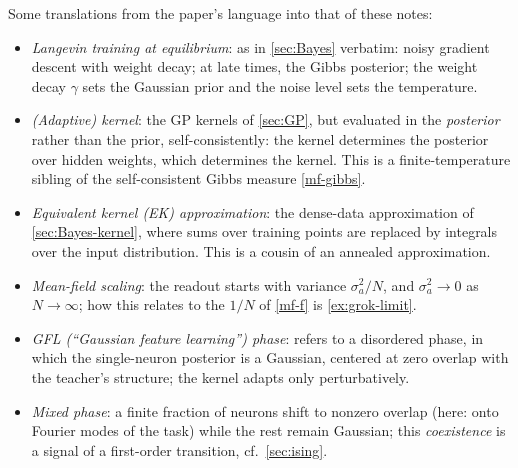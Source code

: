 \documentclass[11pt]{article}
\begin{document}
\begin{callout}[note]
Some translations from the paper's language into that of these notes:
\begin{itemize}
    \item \emph{Langevin training at equilibrium}: as in \cref{sec:Bayes} verbatim: noisy gradient descent with weight decay; at late times, the Gibbs posterior; the weight decay $\gamma$ sets the Gaussian prior and the noise level sets the temperature.
    \item \emph{(Adaptive) kernel}: the GP kernels of \cref{sec:GP}, but evaluated in the \emph{posterior} rather than the prior, self-consistently: the kernel determines the posterior over hidden weights, which determines the kernel. This is a finite-temperature sibling of the self-consistent Gibbs measure \eqref{mf-gibbs}.
    \item \emph{Equivalent kernel (EK) approximation}: the dense-data approximation of \cref{sec:Bayes-kernel}, where sums over training points are replaced by integrals over the input distribution. This is a cousin of an annealed approximation.
    \item \emph{Mean-field scaling}: the readout starts with variance $\sigma_a^2/N$, and $\sigma_a^2\to0$ as $N\to\infty$; how this relates to the $1/N$ of \eqref{mf-f} is \cref{ex:grok-limit}.
    \item \emph{GFL (``Gaussian feature learning'') phase}: refers to a disordered phase, in which the single-neuron posterior is a Gaussian, centered at zero overlap with the teacher's structure; the kernel adapts only perturbatively.
    \item \emph{Mixed phase}: a finite fraction of neurons shift to nonzero overlap (here: onto Fourier modes of the task) while the rest remain Gaussian; this \emph{coexistence} is a signal of a first-order transition, cf.\ \cref{sec:ising}.
\end{itemize}
\end{callout}
\end{document}
